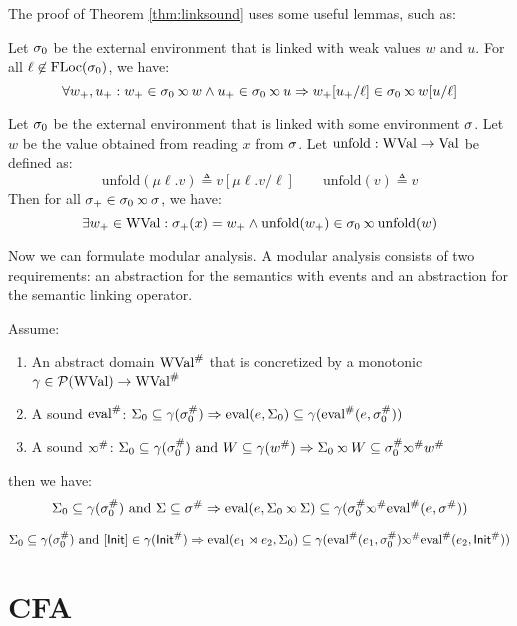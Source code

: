 \documentclass{article}
\begin{document}
The proof of Theorem \ref{thm:linksound} uses some useful lemmas, such as:
\begin{lem}
	Let $\sigma_0$ be the external environment that is linked with weak values $w$ and $u$.
	For all $\ell\not\in\text{FLoc}(\sigma_0)$, we have:
	\[\forall w_+,u_+:w_+\in\ctx_0\semlink w\wedge u_+\in\ctx_0\semlink u\Rightarrow w_+[u_+/\ell]\in\ctx_0\semlink w[u/\ell]\]
\end{lem}
\begin{lem}
	Let $\sigma_0$ be the external environment that is linked with some environment $\sigma$.
	Let $w$ be the value obtained from reading $x$ from $\sigma$.
	Let $\text{unfold}:\text{WVal}\rightarrow\text{Val}$ be defined as:
	\[\text{unfold}(\mu\ell.v)\triangleq v[\mu\ell.v/\ell]\qquad\text{unfold}(v)\triangleq v\]
	Then for all $\ctx_+\in\ctx_0\semlink\ctx$, we have:
	\[\exists w_+\in\Walue:\ctx_+(x)=w_+\land\text{unfold}(w_+)\in\ctx_0\semlink\text{unfold}(w)\]
\end{lem}
Now we can formulate modular analysis.
A modular analysis consists of two requirements: an abstraction for the semantics with events and an abstraction for the semantic linking operator.
\begin{thm}
	Assume:
	\begin{enumerate}
		\item An abstract domain ${\text{WVal}}^{\#}$ that is concretized by a monotonic $\gamma\in\mathcal{P}(\text{WVal})\rightarrow{\text{WVal}}^{\#}$
		\item A sound ${\text{eval}}^{\#}$: $\Sigma_0\subseteq\gamma({\sigma}^{\#}_0)\Rightarrow\text{eval}(e,\Sigma_0)\subseteq\gamma({\text{eval}}^{\#}(e,{\sigma}^{\#}_0))$
		\item A sound $\Abs\semlink$: $\Sigma_0\subseteq\gamma(\Abs\ctx_0)\text{ and }W\subseteq\gamma(\Abs{w})\Rightarrow\Sigma_0\semlink W\subseteq\Abs\ctx_0\Abs\semlink\Abs{w}$
	\end{enumerate}
	then we have:
	\[\Sigma_0\subseteq\gamma(\Abs\ctx_0)\text{ and }\Sigma\subseteq\Abs\ctx\Rightarrow\eval(e,\Sigma_0\semlink\Sigma)\subseteq\gamma(\Abs\ctx_0\Abs\semlink\Abs\eval(e,\Abs\ctx))\]
\end{thm}
\begin{cor}
	\[\Sigma_0\subseteq\gamma(\Abs\ctx_0)\text{ and }[\InitE]\in\gamma(\Abs\InitE)\Rightarrow\eval(e_1\synlink e_2,\Sigma_0)\subseteq\gamma(\Abs\eval(e_1,\Abs\ctx_0)\Abs\semlink\Abs\eval(e_2,\Abs\InitE))\]
\end{cor}
\clearpage
\section{CFA}
\end{document}

